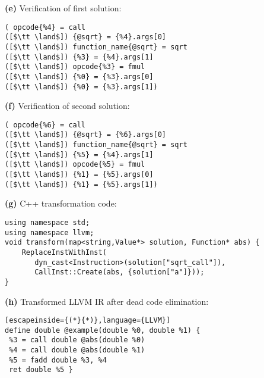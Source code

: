 \vspace{1em}
\begin{minipage}[t]{\textwidth}
\begin{minipage}[t]{0.493\textwidth}
\centering
{\bf(e)} Verification of first solution:
\begin{lstlisting}[language=CAnDL,numbers=none,framexleftmargin=0pt,xleftmargin=0pt]
( opcode{%4} = call
([$\tt \land$]) {@sqrt} = {%4}.args[0]
([$\tt \land$]) function_name{@sqrt} = sqrt
([$\tt \land$]) {%3} = {%4}.args[1]
([$\tt \land$]) opcode{%3} = fmul
([$\tt \land$]) {%0} = {%3}.args[0]
([$\tt \land$]) {%0} = {%3}.args[1])
\end{lstlisting}
\end{minipage}
\hfill
\begin{minipage}[t]{0.493\textwidth}
\centering
{\bf(f)} Verification of second solution:
\begin{lstlisting}[language=CAnDL,numbers=none,framexleftmargin=0pt,xleftmargin=0pt]
( opcode{%6} = call
([$\tt \land$]) {@sqrt} = {%6}.args[0]
([$\tt \land$]) function_name{@sqrt} = sqrt
([$\tt \land$]) {%5} = {%4}.args[1]
([$\tt \land$]) opcode{%5} = fmul
([$\tt \land$]) {%1} = {%5}.args[0]
([$\tt \land$]) {%1} = {%5}.args[1])
\end{lstlisting}
\end{minipage}
\end{minipage}

\vspace{1em}
\begin{minipage}[t]{\textwidth}
\centering
{\bf(g)} C++ transformation code:
\begin{lstlisting}
using namespace std;
using namespace llvm;
void transform(map<string,Value*> solution, Function* abs) {
    ReplaceInstWithInst(
       dyn_cast<Instruction>(solution["sqrt_call"]),
       CallInst::Create(abs, {solution["a"]}));
}
\end{lstlisting}
\end{minipage}

\vspace{1em}
\begin{minipage}[t]{\textwidth}
\centering
{\bf(h)} Transformed LLVM IR after dead code elimination:
\begin{lstlisting}[escapeinside={(*}{*)},language={LLVM}]
define double @example(double %0, double %1) {              
 %3 = call double @abs(double %0) 
 %4 = call double @abs(double %1)
 %5 = fadd double %3, %4   
 ret double %5 }
\end{lstlisting}
\end{minipage}

\caption{Demonstration of CAnDL specification in 
         on an example C program ({\bf a}):
         In the generated LLVM IR code ({\bf b}), two instances
         ({\bf c},{\bf d}) of {\tt SqrtOfSquare} are detected that fulfil all
         the constraints ({\bf e}, {\bf f}).
         Applying a transformation is simple ({\bf g}) and results in efficient
         code ({\bf h}).\parfillskip=0pt}
